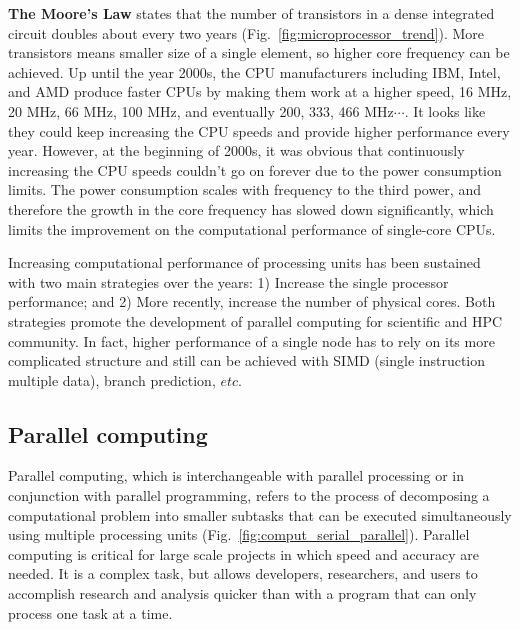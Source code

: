 \par
\textbf{The Moore's Law} states that the number of transistors in a dense integrated circuit doubles about every two years (Fig.~\ref{fig:microprocessor_trend}).
More transistors means smaller size of a single element, so higher core frequency can be achieved.
Up until the year 2000s, the CPU manufacturers including IBM, Intel, and AMD produce faster CPUs by making them work at a higher speed, 16 MHz, 20 MHz, 66 MHz, 100 MHz, and eventually 200, 333, 466 MHz$\cdots$.
It looks like they could keep increasing the CPU speeds and provide higher performance every year.
However, at the beginning of 2000s, it was obvious that continuously increasing the CPU speeds couldn’t go on forever due to the power consumption limits.
The power consumption scales with frequency to the third power, and therefore the growth in the core frequency has slowed down significantly, which limits the improvement on the computational performance of single-core CPUs.


\par
Increasing computational performance of processing units has been sustained with two main strategies over the years: 1) Increase the single processor performance; and 2) More recently, increase the number of physical cores.
Both strategies promote the development of parallel computing for scientific and HPC community.
In fact, higher performance of a single node has to rely on its more complicated structure and still can be achieved with SIMD (single instruction multiple data), branch prediction, $etc$.




\subsection{Parallel computing}


\par
Parallel computing, which is interchangeable with parallel processing or in conjunction with parallel programming, refers to the process of decomposing a computational problem into smaller subtasks that can be executed simultaneously using multiple processing units (Fig.~\ref{fig:comput_serial_parallel}).
Parallel computing is critical for large scale projects in which speed and accuracy are needed.
It is a complex task, but allows developers, researchers, and users to accomplish research and analysis quicker than with a program that can only process one task at a time.


